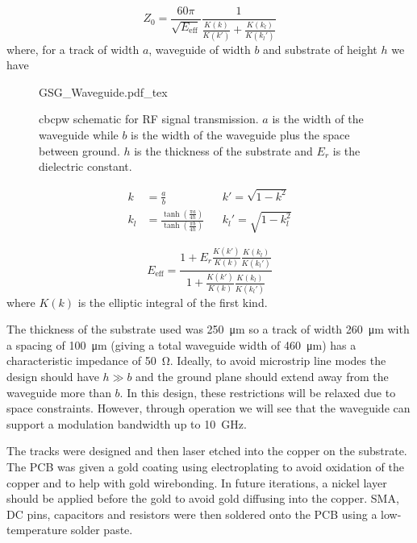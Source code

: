 \begin{equation}
	Z_0 = \frac{60\pi}{\sqrt{E_\text{eff}}}\frac{1}{\frac{K(k)}{K(k')} + \frac{K(k_l)}{K(k_l')}}
\end{equation}
where, for a track of width $a$, waveguide of width $b$ and substrate of height $h$ we have

\begin{figure}[t]
	\centering
	\Large
	\def\svgwidth{0.6\textwidth} 
	{GSG_Waveguide.pdf_tex}
	\caption[Conductor-backed coplanar waveguide structure]{\ac{cbcpw} schematic for RF signal transmission. $a$ is the width of the waveguide while $b$ is the width of the waveguide plus the space between ground. $h$ is the thickness of the substrate and $E_r$ is the dielectric constant.}
	\label{fig:GSG_waveguide}
\end{figure}

\begin{align}
	k &= \frac{a}{b} &&k' = \sqrt{1 - k^2}\\
	k_l &= \frac{\tanh\left(\frac{\pi a}{4 h}\right)}{\tanh\left(\frac{\pi b}{4 h}\right)} &&k_l' = \sqrt{1 - k_l^2}
\end{align}

\begin{equation}
	E_\text{eff} = \frac{1 + E_r \frac{K(k')}{K(k)} \frac{K(k_l)}{K(k_l')}}{1 + \frac{K(k')}{K(k)} \frac{K(k_l)}{K(k_l')}}
\end{equation}
where $K(k)$ is the elliptic integral of the first kind. 

The thickness of the substrate used was \SI{250}{\um} so a track of width \SI{260}{\um} with a spacing of \SI{100}{\um} (giving a total waveguide width of \SI{460}{\um}) has a characteristic impedance of \SI{50}{\ohm}. Ideally, to avoid microstrip line modes the design should have $h \gg b$ and the ground plane should extend away from the waveguide more than $b$\cite{riaziat1987}. In this design, these restrictions will be relaxed due to space constraints. However, through operation we will see that the waveguide can support a modulation bandwidth up to \SI{10}{GHz}.

The tracks were designed and then laser etched into the copper on the substrate. The PCB was given a gold coating using electroplating to avoid oxidation of the copper and to help with gold wirebonding. In future iterations, a nickel layer should be applied before the gold to avoid gold diffusing into the copper. SMA, DC pins, capacitors and resistors were then soldered onto the PCB using a low-temperature solder paste.

